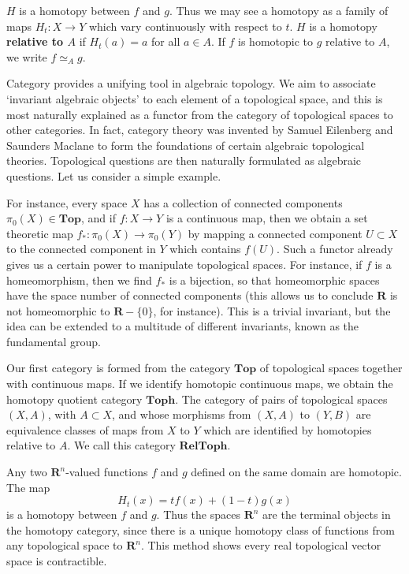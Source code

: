 $H$ is a homotopy between $f$ and $g$. Thus we may see a homotopy as a family of maps $H_t: X \to Y$ which vary continuously with respect to $t$. $H$ is a homotopy {\bf relative to $A$} if $H_t(a) = a$ for all $a \in A$. If $f$ is homotopic to $g$ relative to $A$, we write $f \simeq_A g$.

Category provides a unifying tool in algebraic topology. We aim to associate `invariant algebraic objects' to each element of a topological space, and this is most naturally explained as a functor from the category of topological spaces to other categories. In fact, category theory was invented by Samuel Eilenberg and Saunders Maclane to form the foundations of certain algebraic topological theories. Topological questions are then naturally formulated as algebraic questions. Let us consider a simple example.

\begin{example}
    For instance, every space $X$ has a collection of connected components $\pi_0(X) \in \textbf{Top}$, and if $f:X \to Y$ is a continuous map, then we obtain a set theoretic map $f_*: \pi_0(X) \to \pi_0(Y)$ by mapping a connected component $U \subset X$ to the connected component in $Y$ which contains $f(U)$. Such a functor already gives us a certain power to manipulate topological spaces. For instance, if $f$ is a homeomorphism, then we find $f_*$ is a bijection, so that homeomorphic spaces have the space number of connected components (this allows us to conclude $\mathbf{R}$ is not homeomorphic to $\mathbf{R} - \{ 0 \}$, for instance). This is a trivial invariant, but the idea can be extended to a multitude of different invariants, known as the fundamental group.
\end{example}


Our first category is formed from the category $\textbf{Top}$ of topological spaces together with continuous maps. If we identify homotopic continuous maps, we obtain the homotopy quotient category $\textbf{Toph}$. The category of pairs of topological spaces $(X,A)$, with $A \subset X$, and whose morphisms from $(X,A)$ to $(Y,B)$ are equivalence classes of maps from $X$ to $Y$ which are identified by homotopies relative to $A$. We call this category $\textbf{RelToph}$.

\begin{example}
    Any two $\mathbf{R}^n$-valued functions $f$ and $g$ defined on the same domain are homotopic. The map
    \[ H_t(x) = t f(x) + (1 - t) g(x) \]
    is a homotopy between $f$ and $g$. Thus the spaces $\mathbf{R}^n$ are the terminal objects in the homotopy category, since there is a unique homotopy class of functions from any topological space to $\mathbf{R}^n$. This method shows every real topological vector space is contractible.
\end{example}

